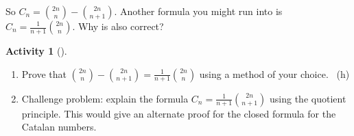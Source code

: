 \documentclass[10pt,]{book}
\theoremstyle{plain}
\theoremstyle{definition}
\theoremstyle{definition}
\theoremstyle{definition}
\newtheorem{activity}[project]{Activity}
\numberwithin{equation}{chapter}
\begin{document}
\hypertarget{p-1035}{}%
So \(C_n = \binom{2n}{n} - \binom{2n}{n+1}\).  Another formula you might run into is \(C_n = \frac{1}{n+1}\binom{2n}{n}\).  Why is also correct?%
\begin{activity}[]\label{activity-176}
\leavevmode%
\begin{enumerate}[font=\bfseries,label=(\alph*),ref=\alph*]
\item\label{task-195} \hypertarget{p-1036}{}%
Prove that \(\binom{2n}{n} - \binom{2n}{n+1} = \frac{1}{n+1}\binom{2n}{n}\) using a method of your choice.%
~{\tiny (h)}\item\label{task-196} \hypertarget{p-1038}{}%
Challenge problem: explain the formula \(C_n = \frac{1}{n+1}\binom{2n}{n+1}\) using the quotient principle.  This would give an alternate proof for the closed formula for the Catalan numbers.%
\end{enumerate}
\end{activity}
\typeout{************************************************}
\typeout{************************************************}
\end{document}
